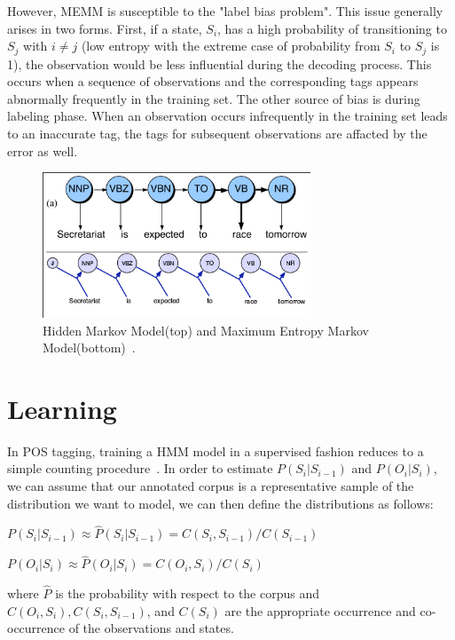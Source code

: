\documentclass{acm_proc_article-sp}
\begin{document}
However, MEMM is susceptible to the "label bias problem". This issue generally arises in two forms. First, if a state, $S_i$, has a high probability of transitioning to $S_j$ with $i \neq j$ (low entropy with the extreme case of probability from $S_i$ to $S_j$ is 1), the observation would be less influential during the decoding process. This occurs when a sequence of observations and the corresponding tags appears abnormally frequently in the training set. The other source of bias is during labeling phase. When an observation occurs infrequently in the training set leads to an inaccurate tag, the tags for subsequent observations are affacted by the error as well. \cite{labelBiasProblem}

\begin{figure}[ht]
\centering
\includegraphics[width=80mm]{figures/memm.png}
\caption{Hidden Markov Model(top) and Maximum Entropy Markov Model(bottom)~\cite{nlpBook}. \label{hmmVmemm}}
\end{figure}

\section{Learning}
In POS tagging, training a HMM model in a supervised fashion reduces to a simple counting procedure~\cite{nlpBook}. In order to estimate $P( S_i | S_{i-1} )$ and $P( O_i | S_i )$, we can assume that our annotated corpus is a representative sample of the distribution we want to model, we can then define the distributions as follows:

$P( S_i | S_{i-1} ) \approx \hat{P}( S_i | S_{i-1} ) = C( S_i, S_{i-1} )/C( S_{i-1} )$

$P( O_i | S_i ) \approx \hat{P}( O_i | S_i ) = C( O_i, S_i )/C( S_i )$

where $\hat{P}$ is the probability with respect to the corpus and $C( O_i, S_i ), C( S_i, S_{i-1} )$, and $C( S_i )$ are the appropriate occurrence and co-occurrence of the observations and states.
\end{document}
